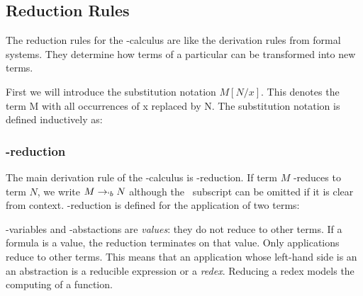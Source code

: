 \subsection{Reduction Rules}
  
  The reduction rules for the \lam-calculus are like the derivation rules from formal systems.
  They determine how terms of a particular can be transformed into new terms.
  
  First we will introduce the substitution notation $M[N/x]$. This denotes 
  the term M with all occurrences of x replaced by N. The substitution 
  notation is defined inductively as:
   
    \begin{figure}[!h]
    \end{figure}

\subsubsection{\bta-reduction}
  The main derivation rule of the \lam-calculus is \bta-reduction. If term
  $M$ \bta-reduces to term $N$, we write $M \rightarrow_{`b} N$ although 
  the \bta\ subscript can be omitted if it is clear from context. \bta-reduction
  is defined for the application of two terms:
  \begin{figure}[!h]\label{def:beta-reduction}
  \end{figure}
 
  \lam-variables and \lam-abstactions are \emph{values}: they do not reduce to other terms. 
  If a formula is a value, the reduction terminates on that value. 
  Only applications reduce to other terms. 
  This means that an application whose left-hand side is an an abstraction is a reducible expression or a \emph{redex}. 
  Reducing a redex models the computing of a function. 

